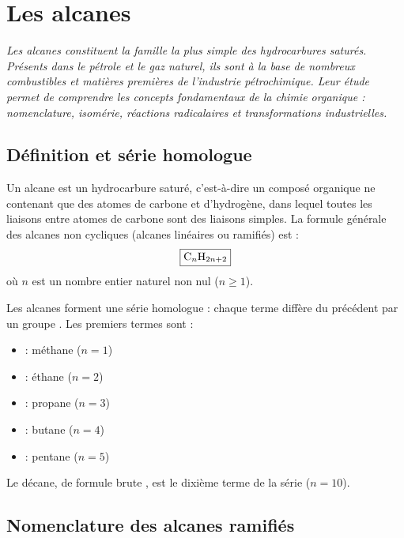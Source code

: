 \chapter{Les alcanes}

\textit{Les alcanes constituent la famille la plus simple des hydrocarbures saturés. Présents dans le pétrole et le gaz naturel, ils sont à la base de nombreux combustibles et matières premières de l'industrie pétrochimique. Leur étude permet de comprendre les concepts fondamentaux de la chimie organique : nomenclature, isomérie, réactions radicalaires et transformations industrielles.}

\section{Définition et série homologue}

\begin{definition}[Alcane]
Un alcane est un hydrocarbure saturé, c'est-à-dire un composé organique ne contenant que des atomes de carbone et d'hydrogène, dans lequel toutes les liaisons entre atomes de carbone sont des liaisons simples. La formule générale des alcanes non cycliques (alcanes linéaires ou ramifiés) est :
\[
\boxed{\ce{C_nH_{2n+2}}}
\]
où \(n\) est un nombre entier naturel non nul (\(n \ge 1\)).
\end{definition}

\begin{propriete}
Les alcanes forment une série homologue : chaque terme diffère du précédent par un groupe . Les premiers termes sont :
\begin{itemize}
    \item {} : méthane (\(n=1\))
    \item {} : éthane (\(n=2\))
    \item {} : propane (\(n=3\))
    \item {} : butane (\(n=4\))
    \item {} : pentane (\(n=5\))
\end{itemize}
\end{propriete}

\begin{exemple}
Le décane, de formule brute , est le dixième terme de la série (\(n=10\)).
\end{exemple}

\section{Nomenclature des alcanes ramifiés}

